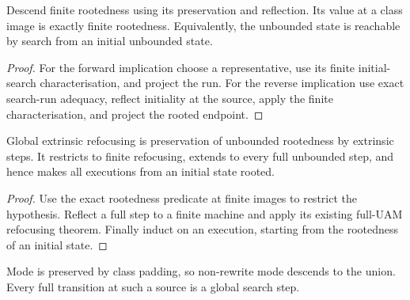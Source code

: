 
\begin{lemma}
Descend finite rootedness using its preservation and reflection. Its value at a class image is exactly finite rootedness. Equivalently, the unbounded state is reachable by search from an initial unbounded state.
\end{lemma}

\begin{proof}
For the forward implication choose a representative, use its finite initial-search characterisation, and project the run. For the reverse implication use exact search-run adequacy, reflect initiality at the source, apply the finite characterisation, and project the rooted endpoint.
\end{proof}






\begin{lemma}
Global extrinsic refocusing is preservation of unbounded rootedness by extrinsic steps. It restricts to finite refocusing, extends to every full unbounded step, and hence makes all executions from an initial state rooted.
\end{lemma}

\begin{proof}
Use the exact rootedness predicate at finite images to restrict the hypothesis. Reflect a full step to a finite machine and apply its existing full-UAM refocusing theorem. Finally induct on an execution, starting from the rootedness of an initial state.
\end{proof}






\begin{lemma}
Mode is preserved by class padding, so non-rewrite mode descends to the union. Every full transition at such a source is a global search step.
\end{lemma}

